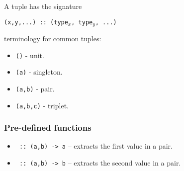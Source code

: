 A tuple has the signature
\begin{center}
  \texttt{(x,y,...) :: (type$_x$, type$_y$, ...)}
\end{center}

terminology for common tuples:
\begin{itemize}
  \item \texttt{()} - unit.
  \item \texttt{(a)} - singleton.
  \item \texttt{(a,b)} - pair.
  \item \texttt{(a,b,c)} - triplet.
\end{itemize}

\subsubsection{Pre-defined functions}
\begin{itemize}
  \item \texttt{ :: (a,b) -> a} -- extracts the first value in a pair.
  \item \texttt{ :: (a,b) -> b} -- extracts the second value in a pair.
\end{itemize}